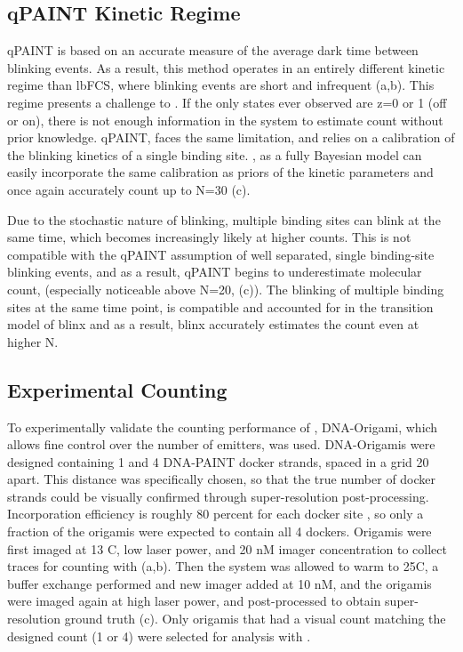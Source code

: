\subsection{qPAINT Kinetic Regime}
qPAINT is based on an accurate measure of the average dark time between blinking events. 
	As a result, this method operates in an entirely different kinetic regime than lbFCS, where blinking 
	events are short and infrequent (a,b).
	This regime presents a challenge to \ours. 
	If the only states ever observed are z=0 or 1 (off or on), there is not enough information in the system to estimate count without prior knowledge.
	qPAINT, faces the same limitation, and relies on a calibration of the blinking kinetics of a single binding site.
	\ours, as a fully Bayesian model can easily incorporate the same calibration as priors of the kinetic parameters
	and once again accurately count up to N=30 (c).

Due to the stochastic nature of blinking, multiple binding sites can blink at the same time, which becomes increasingly likely at higher counts.
	This is not compatible with the qPAINT assumption of well separated, single binding-site blinking events, 
	and as a result, qPAINT begins to underestimate molecular count, (especially noticeable above N=20, (c)). 
	The blinking of multiple binding sites at the same time point, 
	is compatible and accounted for in the transition model of blinx 
	and as a result, blinx accurately estimates the count even at higher N.
	

\subsection{Experimental Counting}
To experimentally validate the counting performance of \ours, DNA-Origami, which allows fine control over the number of emitters, was used.
	DNA-Origamis were designed containing 1 and 4 DNA-PAINT docker strands, spaced in a grid 20 \nanometer apart. 
	This distance was specifically chosen, so that the true number of docker strands could be visually confirmed through super-resolution post-processing.
	Incorporation efficiency is roughly 80 percent for each docker site \cite{strauss_2018}, so only a fraction of the origamis were expected to contain all 4 dockers. 
	Origamis were first imaged at 13 C, low laser power, and 20 nM imager concentration to collect traces for counting with \ours (a,b).
	Then the system was allowed to warm to 25C, a buffer exchange performed and new imager added at 10 nM, and the origamis were imaged again at high laser power,
	and post-processed to obtain super-resolution ground truth (c).
	Only origamis that had a visual count matching the designed count (1 or 4) were selected for analysis with \ours.

